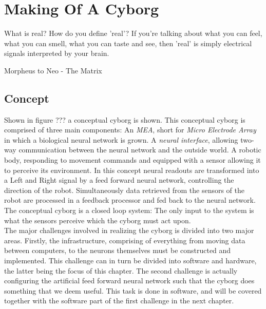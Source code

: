 \chapter{Making Of A Cyborg}
\epigraph{What is real? How do you define 'real'? If you're talking about what
you can feel, what you can smell, what you can taste and see, then 'real' is
simply electrical signals interpreted by your brain.}
{Morpheus to Neo - The Matrix}
\section{Concept}
Shown in figure ??? a conceptual cyborg is shown.
This conceptual cyborg is comprised of three main components: An \emph{MEA}, short
for \emph{Micro Electrode Array} in which a biological neural network is grown.
A \emph{neural interface}, allowing two-way communication between the neural network and
the outside world.
A robotic body, responding to movement commands and equipped with a sensor
allowing it to perceive its environment.
In this concept neural readouts are transformed into a Left and Right signal by
a feed forward neural network, controlling the direction of the robot.
Simultaneously data retrieved from the sensors of the robot are processed in a
feedback processor and fed back to the neural network.
The conceptual cyborg is a closed loop system: The only input to the system is
what the sensors perceive which the cyborg must act upon.\\
The major challenges involved in realizing the cyborg is divided into two major
areas.
Firstly, the infrastructure, comprising of everything from moving data between
computers, to the neurons themselves must be constructed and implemented.
This challenge can in turn be divided into software and hardware, the latter
being the focus of this chapter.
The second challenge is actually configuring the artificial feed forward neural
network such that the cyborg does something that we deem useful.
This task is done in software, and will be covered together with the software
part of the first challenge in the next chapter.
